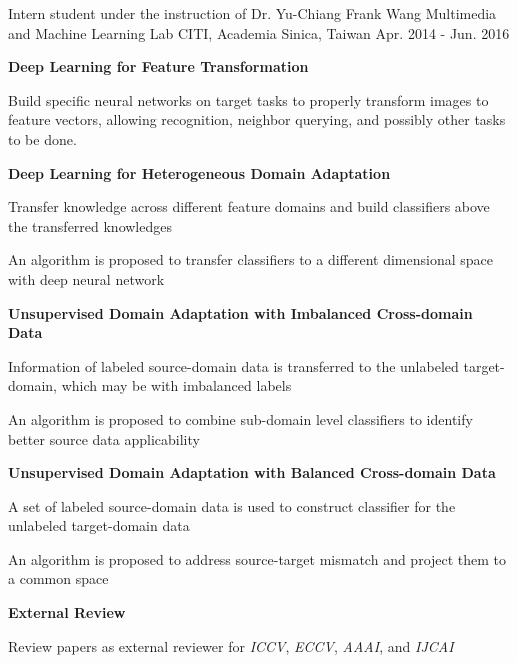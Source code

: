 \documentclass[12pt, a4paper]{awesome-cv}
\begin{document}
\begin{cventries}
    \cventry
    {Intern student under the instruction of Dr. Yu-Chiang Frank Wang}
    {Multimedia and Machine Learning Lab}
    {CITI, Academia Sinica, Taiwan}
    {Apr. 2014 - Jun. 2016}
    {
        \begin{cvitems}
        \item{\bfseries Deep Learning for Feature Transformation}
            \begin{cvitems}
            \item{Build specific neural networks on target tasks to properly transform images to feature vectors, allowing recognition, neighbor querying, and possibly other tasks to be done.}
            \end{cvitems}
        \item{\bfseries Deep Learning for Heterogeneous Domain Adaptation}
            \begin{cvitems}
            \item{Transfer knowledge across different feature domains and build classifiers above the transferred knowledges}
            \item{An algorithm is proposed to transfer classifiers to a different dimensional space with deep neural network}
            \end{cvitems}
        \item{\bfseries Unsupervised Domain Adaptation with Imbalanced Cross-domain Data}
            \begin{cvitems}
            \item{Information of labeled source-domain data is transferred to the unlabeled target-domain, which may be with imbalanced labels}
            \item{An algorithm is proposed to combine sub-domain level classifiers to identify better source data applicability}
            \end{cvitems}
        \item{\bfseries Unsupervised Domain Adaptation with Balanced Cross-domain Data}
            \begin{cvitems}
            \item{A set of labeled source-domain data is used to construct classifier for the unlabeled target-domain data}
            \item{An algorithm is proposed to address source-target mismatch and project them to a common space}
            \end{cvitems}
        \item{\bfseries External Review}
            \begin{cvitems}
            \item{Review papers as external reviewer for \emph{ICCV}, \emph{ECCV}, \emph{AAAI}, and \emph{IJCAI}}
            \end{cvitems}
        \end{cvitems}
    }
    \vspace{-5mm}


\end{cventries}
\end{document}
